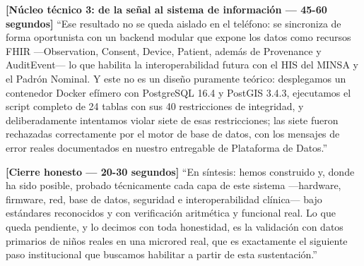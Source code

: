 \documentclass[11pt,a4paper]{article}
\begin{document}
\textbf{{[}Núcleo técnico 3: de la señal al sistema de información --- 45-60 segundos{]}}
``Ese resultado no se queda aislado en el teléfono: se sincroniza de forma oportunista con un backend modular que expone los datos como recursos FHIR ---Observation, Consent, Device, Patient, además de Provenance y AuditEvent--- lo que habilita la interoperabilidad futura con el HIS del MINSA y el Padrón Nominal. Y este no es un diseño puramente teórico: desplegamos un contenedor Docker efímero con PostgreSQL 16.4 y PostGIS 3.4.3, ejecutamos el script completo de 24 tablas con sus 40 restricciones de integridad, y deliberadamente intentamos violar siete de esas restricciones; las siete fueron rechazadas correctamente por el motor de base de datos, con los mensajes de error reales documentados en nuestro entregable de Plataforma de Datos.''

\textbf{{[}Cierre honesto --- 20-30 segundos{]}}
``En síntesis: hemos construido y, donde ha sido posible, probado técnicamente cada capa de este sistema ---hardware, firmware, red, base de datos, seguridad e interoperabilidad clínica--- bajo estándares reconocidos y con verificación aritmética y funcional real. Lo que queda pendiente, y lo decimos con toda honestidad, es la validación con datos primarios de niños reales en una microred real, que es exactamente el siguiente paso institucional que buscamos habilitar a partir de esta sustentación.''
\end{document}
